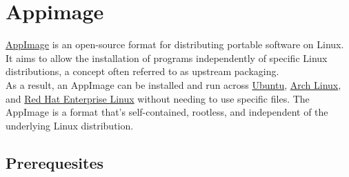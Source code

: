 \newpage
\newcommand{\abuild}{\bftt{appimage-builder}}
\newcommand{\pbuild}{\bftt{pkg2appimage}}

\section{Appimage}

\href{https://appimage.org/}{AppImage} is an open-source format for distributing portable software on Linux.  
It aims to allow the installation of programs independently of specific Linux distributions, a concept often referred to as upstream packaging. \\
As a result, an AppImage can be installed and run across \href{https://ubuntu.com}{Ubuntu}, \href{https://archlinux.org}{Arch Linux}, and \href{https://www.redhat.com}{Red Hat Enterprise Linux} without needing to use specific files. 
The AppImage is a format that's self-contained, rootless, and independent of the underlying Linux distribution. 

\subsection{Prerequesites}

